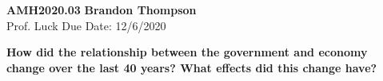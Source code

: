 \noindent
\textbf{AMH2020.03} \hfill \textbf{Brandon Thompson} \\
\normalsize Prof. Luck \hfill Due Date: 12/6/2020 \\

\begin{center}
\textbf{How did the relationship between the government and economy change over the last 40 years? What effects did this change have?}
\end{center}